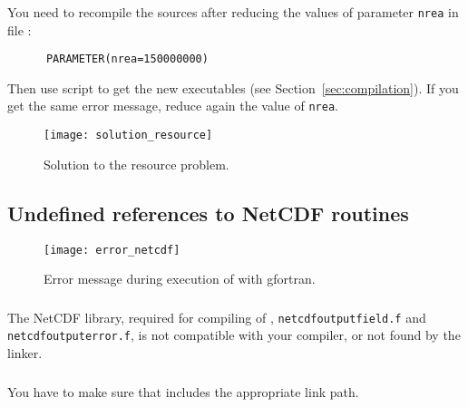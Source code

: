 \subsubsection{\answer}

You need to recompile the sources after reducing the values of parameter \texttt{nrea} in file :
\begin{verbatim}
      PARAMETER(nrea=150000000)
\end{verbatim}
Then use script  to get the new executables (see Section~\ref{sec:compilation}). If you get the same error message, reduce again the value of \texttt{nrea}.

\begin{figure}[htpb]
\centering
\texttt{[image: solution\_resource]}
\caption{Solution to the resource problem.}
\end{figure}


\subsection{Undefined references to NetCDF routines\label{sec:error_netcdf}}

\begin{figure}[htpb]
\centering
\texttt{[image: error\_netcdf]}
\caption{Error message during execution of  with gfortran\label{fig:error_netcdf}.}
\end{figure}

\subsubsection{\question}

The NetCDF library, required for compiling of , \texttt{netcdf\-output\-field.f} and \texttt{netcdf\-output\-error.f}, is not compatible with your compiler, or not found by the linker.

\subsubsection{\answer}

You have to make sure that  includes the appropriate link path.

